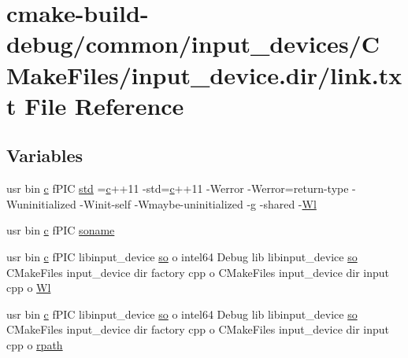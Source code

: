 \hypertarget{common_2input__devices_2CMakeFiles_2input__device_8dir_2link_8txt}{}\section{cmake-\/build-\/debug/common/input\+\_\+devices/\+C\+Make\+Files/input\+\_\+device.dir/link.txt File Reference}
\label{common_2input__devices_2CMakeFiles_2input__device_8dir_2link_8txt}
\subsection*{Variables}
\begin{DoxyCompactItemize}
\item 
usr bin \hyperlink{CMakeCache_8txt_aac1d6a1710812201527c735f7c6afbaa}{c} f\+P\+IC \hyperlink{common_2input__devices_2CMakeFiles_2input__device_8dir_2link_8txt_a5f87c8f8e33670f7c8c5221b6be1bcc4}{std} =\hyperlink{CMakeCache_8txt_aac1d6a1710812201527c735f7c6afbaa}{c}++11 -\/std=\hyperlink{CMakeCache_8txt_aac1d6a1710812201527c735f7c6afbaa}{c}++11 -\/Werror -\/Werror=return-\/type -\/Wuninitialized -\/Winit-\/self -\/Wmaybe-\/uninitialized -\/g -\/shared -\/\hyperlink{thirdparty_2extension_2CMakeFiles_2cpu__extension_8dir_2link_8txt_af9ccbf658ed2deb89d0d79f211e5b033}{Wl}
\item 
usr bin \hyperlink{CMakeCache_8txt_aac1d6a1710812201527c735f7c6afbaa}{c} f\+P\+IC \hyperlink{common_2input__devices_2CMakeFiles_2input__device_8dir_2link_8txt_ab65a9b6457c4853ed17f89f945516e66}{soname}
\item 
usr bin \hyperlink{CMakeCache_8txt_aac1d6a1710812201527c735f7c6afbaa}{c} f\+P\+IC libinput\+\_\+device \hyperlink{CMakeCache_8txt_aa98797039f48d335ee715de4cd92852f}{so} o intel64 Debug lib libinput\+\_\+device \hyperlink{CMakeCache_8txt_aa98797039f48d335ee715de4cd92852f}{so} C\+Make\+Files input\+\_\+device dir factory cpp o C\+Make\+Files input\+\_\+device dir input cpp o \hyperlink{common_2input__devices_2CMakeFiles_2input__device_8dir_2link_8txt_a4b35f26da33033cb4cf93156e111b3d1}{Wl}
\item 
usr bin \hyperlink{CMakeCache_8txt_aac1d6a1710812201527c735f7c6afbaa}{c} f\+P\+IC libinput\+\_\+device \hyperlink{CMakeCache_8txt_aa98797039f48d335ee715de4cd92852f}{so} o intel64 Debug lib libinput\+\_\+device \hyperlink{CMakeCache_8txt_aa98797039f48d335ee715de4cd92852f}{so} C\+Make\+Files input\+\_\+device dir factory cpp o C\+Make\+Files input\+\_\+device dir input cpp o \hyperlink{common_2input__devices_2CMakeFiles_2input__device_8dir_2link_8txt_a28c306bee8ae7261d27ae155acb7e328}{rpath}
\end{DoxyCompactItemize}


